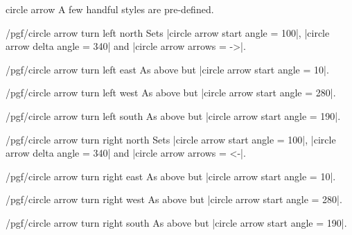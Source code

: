 \begin{shape}{circle arrow}
  A few handful styles are pre-defined.
  \begin{key}{/pgf/circle arrow turn left north}
  Sets |circle arrow start angle = 100|, |circle arrow delta angle = 340|
  and |circle arrow arrows = ->|.
  \end{key}
  \begin{key}{/pgf/circle arrow turn left east}
  As above but |circle arrow start angle = 10|.
  \end{key}
  \begin{key}{/pgf/circle arrow turn left west}
  As above but |circle arrow start angle = 280|.
  \end{key}
  \begin{key}{/pgf/circle arrow turn left south}
  As above but |circle arrow start angle = 190|.
  \end{key}
  \begin{key}{/pgf/circle arrow turn right north}
  Sets |circle arrow start angle = 100|, |circle arrow delta angle = 340|
  and |circle arrow arrows = <-|.
  \end{key}
  \begin{key}{/pgf/circle arrow turn right east}
  As above but |circle arrow start angle = 10|.
  \end{key}
  \begin{key}{/pgf/circle arrow turn right west}
  As above but |circle arrow start angle = 280|.
  \end{key}
  \begin{key}{/pgf/circle arrow turn right south}
  As above but |circle arrow start angle = 190|.
  \end{key}


\end{shape}
